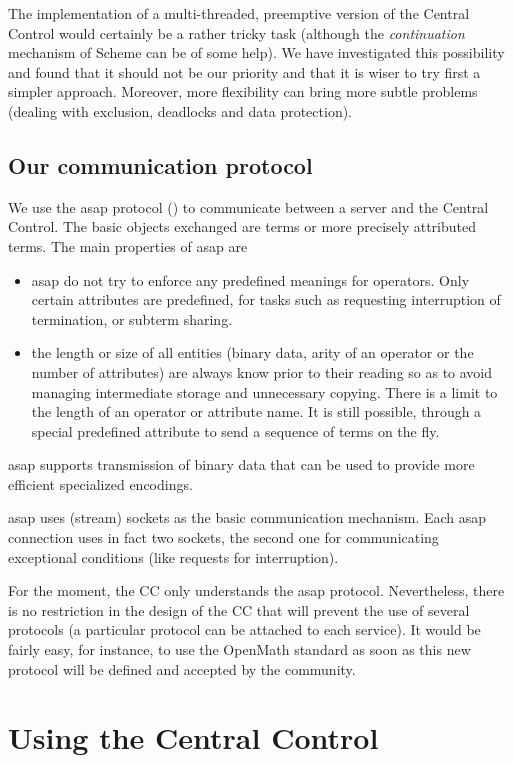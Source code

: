 \documentclass {article}
\begin{document}
The implementation of a multi-threaded, preemptive version of the Central
Control would certainly be a rather tricky task (although the 
{\sl continuation} mechanism of Scheme can be of some help). 
We have investigated this possibility and found that it should not be our
priority and that it is wiser to try first a simpler approach. Moreover, more
flexibility can bring more subtle problems (dealing with exclusion, deadlocks
and data protection). 

\subsection{ Our communication protocol }

We use the {\sc asap} protocol (\cite{kn:ASAP}) to communicate between a
server and the Central Control.
The basic objects exchanged are terms or more precisely attributed terms.
The main properties of {\sc asap} are
\begin{itemize} 
\item {\sc asap} do not try to enforce any predefined meanings for
operators. Only certain attributes are predefined, for tasks such as
requesting interruption of termination, or subterm sharing.
\item the length or size of all entities (binary data, arity of an operator
or the number of attributes) are always know prior to their reading so as to
avoid managing intermediate storage and unnecessary copying. There is a
limit to the length of an operator or attribute name. It is still possible,
through a special predefined attribute to send a sequence of terms on the
fly. 
\end{itemize} 
{\sc asap} supports transmission of binary data that can be used to provide
more efficient specialized encodings.

{\sc asap} uses (stream) sockets as the basic communication mechanism. 
Each {\sc asap} connection uses in fact two sockets, the second one for
communicating exceptional conditions (like requests for interruption).

 For the moment, the CC only understands the {\sc asap} protocol.
Nevertheless, there is no restriction in the design of the CC that will
prevent the use of several protocols (a particular protocol can be attached
to each service). It would be fairly easy, for instance, to use the
OpenMath standard as soon as this new protocol will be defined and accepted by
the community.

\section{ Using the Central Control }
\end{document}
